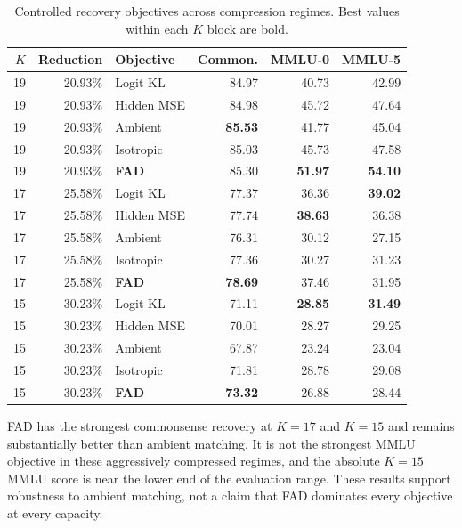 \documentclass{article}
\theoremstyle{plain}
\theoremstyle{definition}
\theoremstyle{remark}
\begin{document}
\begin{table}[H]
\caption{Controlled recovery objectives across compression regimes.  Best values
within each $K$ block are bold.}
\label{tab:app-compression-objectives}
\centering
\footnotesize
\setlength{\tabcolsep}{5pt}
\begin{tabular}{@{}rrlrrr@{}}
\toprule
$K$ & \textbf{Reduction} & \textbf{Objective} & \textbf{Common.}
& \textbf{MMLU-0} & \textbf{MMLU-5}\\
\midrule
19 & 20.93\% & Logit KL & 84.97 & 40.73 & 42.99\\
19 & 20.93\% & Hidden MSE & 84.98 & 45.72 & 47.64\\
19 & 20.93\% & Ambient & \textbf{85.53} & 41.77 & 45.04\\
19 & 20.93\% & Isotropic & 85.03 & 45.73 & 47.58\\
19 & 20.93\% & \textbf{FAD} & 85.30 & \textbf{51.97} & \textbf{54.10}\\
\midrule
17 & 25.58\% & Logit KL & 77.37 & 36.36 & \textbf{39.02}\\
17 & 25.58\% & Hidden MSE & 77.74 & \textbf{38.63} & 36.38\\
17 & 25.58\% & Ambient & 76.31 & 30.12 & 27.15\\
17 & 25.58\% & Isotropic & 77.36 & 30.27 & 31.23\\
17 & 25.58\% & \textbf{FAD} & \textbf{78.69} & 37.46 & 31.95\\
\midrule
15 & 30.23\% & Logit KL & 71.11 & \textbf{28.85} & \textbf{31.49}\\
15 & 30.23\% & Hidden MSE & 70.01 & 28.27 & 29.25\\
15 & 30.23\% & Ambient & 67.87 & 23.24 & 23.04\\
15 & 30.23\% & Isotropic & 71.81 & 28.78 & 29.08\\
15 & 30.23\% & \textbf{FAD} & \textbf{73.32} & 26.88 & 28.44\\
\bottomrule
\end{tabular}
\end{table}

FAD has the strongest commonsense recovery at $K=17$ and $K=15$ and remains
substantially better than ambient matching.  It is not the strongest MMLU objective
in these aggressively compressed regimes, and the absolute $K=15$ MMLU score is
near the lower end of the evaluation range.  These results support robustness to
ambient matching, not a claim that FAD dominates every objective at every capacity.
\end{document}
